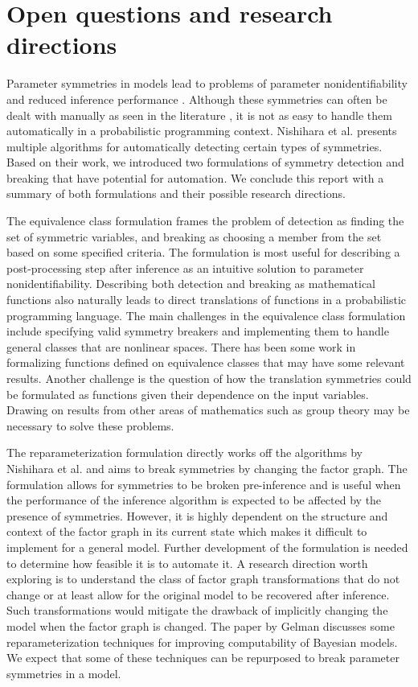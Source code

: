 

\section{Open questions and research directions}

Parameter symmetries in models lead to problems of parameter nonidentifiability and reduced inference performance \cite{Nishihara:2013}. Although these symmetries can often be dealt with manually as seen in the literature \cite{Bafumi:2005,Stephens:2000}, it is not as easy to handle them automatically in a probabilistic programming context. Nishihara et al. \cite{Nishihara:2013} presents multiple algorithms for automatically detecting certain types of symmetries. Based on their work, we introduced two formulations of symmetry detection and breaking that have potential for automation. We conclude this report with a summary of both formulations and their possible research directions.

The equivalence class formulation frames the problem of detection as finding the set of symmetric variables, and breaking as choosing a member from the set based on some specified criteria. The formulation is most useful for describing a post-processing step after inference as an intuitive solution to parameter nonidentifiability. Describing both detection and breaking as mathematical functions also naturally leads to direct translations of functions in a probabilistic programming language. The main challenges in the equivalence class formulation include specifying valid symmetry breakers and implementing them to handle general classes that are nonlinear spaces. There has been some work in formalizing functions defined on equivalence classes \cite{Paulson:2006} that may have some relevant results. Another challenge is the question of how the translation symmetries could be formulated as functions given their dependence on the input variables. Drawing on results from other areas of mathematics such as group theory may be necessary to solve these problems.

The reparameterization formulation directly works off the algorithms by Nishihara et al. \cite{Nishihara:2013} and aims to break symmetries by changing the factor graph. The formulation allows for symmetries to be broken pre-inference and is useful when the performance of the inference algorithm is expected to be affected by the presence of symmetries. However, it is highly dependent on the structure and context of the factor graph in its current state which makes it difficult to implement for a general model. Further development of the formulation is needed to determine how feasible it is to automate it. A research direction worth exploring is to understand the class of factor graph transformations that do not change or at least allow for the original model to be recovered after inference. Such transformations would mitigate the drawback of implicitly changing the model when the factor graph is changed. The paper by Gelman \cite{Gelman:2004} discusses some reparameterization techniques for improving computability of Bayesian models. We expect that some of these techniques can be repurposed to break parameter symmetries in a model.